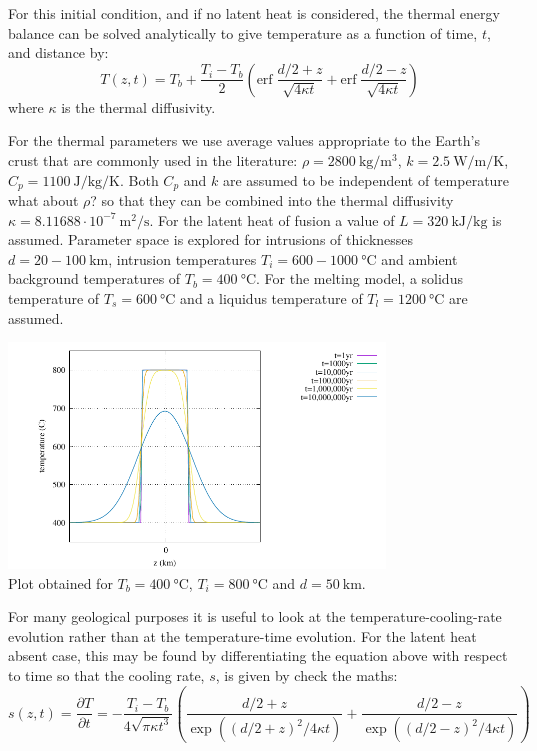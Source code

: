 For this initial condition, and if no latent
heat is considered, the thermal energy balance
can be solved analytically to give temperature as
a function of time, $t$, and distance by:
\[
T(z,t)=T_b + \frac{T_i-T_b}{2} 
\left(
\text{erf} \; \frac{d/2 +z}{\sqrt{4\kappa t}}
+
\text{erf} \; \frac{d/2 -z}{\sqrt{4\kappa t}}
\right)
\]
where $\kappa$ is the thermal diffusivity.


For the thermal parameters we use average
values appropriate to the Earth's crust that are
commonly used in the literature:
$\rho=2800~\si{\kg\per\cubic\meter}$, $k=2.5~\si{\watt\per\meter\per\kelvin}$, $C_p=1100~\si{\joule\per\kg\per\kelvin}$.
Both $C_p$ and $k$ are assumed to be independent of
temperature {\color{red} what about $\rho$?} 
so that they can be combined into the thermal diffusivity $\kappa=8.11688\cdot10^{-7}~\si{\square\meter\per\second}$.
For the latent heat of fusion a value
of $L = 320~\si{\kilo\joule\per\kg}$ is assumed. Parameter space
is explored for intrusions of thicknesses $d = 20 - 100~\si{\km}$, 
intrusion temperatures $T_i = 600-1000~\si{\celsius}$
and ambient background temperatures of $T_b =400~\si{\celsius}$. 
For the melting model, a solidus temperature of $T_s=600~\si{\celsius}$ and a 
liquidus temperature of $T_l = 1200~\si{\celsius}$ are assumed.


\begin{center}
\includegraphics[width=10cm]{python_codes/fieldstone_169/images/solution.pdf}\\
{\captionfont Plot obtained for $T_b=400~\si{\celsius}$, $T_i=800~\si{\celsius}$ and $d=50~\si{\km}$.}
\end{center}


For many geological purposes it is useful to look at the
temperature-cooling-rate evolution rather than at
the temperature-time evolution. For the latent
heat absent case, this may be found by differentiating the equation above 
with respect to time so that the cooling rate, $s$, is given by {\color{red} check the maths}:
\[
s(z,t) = \frac{\partial T}{\partial t}
=-\frac{T_i-T_b}{4\sqrt{\pi \kappa t^3}}
\left(
\frac{d/2 +z}{\exp((d/2+z)^2/4\kappa t )}
+
\frac{d/2 -z}{\exp((d/2-z)^2/4\kappa t )}
\right)
\]

